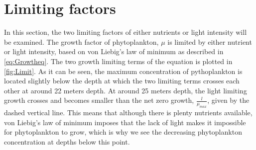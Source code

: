 \newpage
\section{Limiting factors}
In this section, the two limiting factors of either nutrients or light intensity will be examined.
The growth factor of phytoplankton, $\mu$ is limited by either nutrient or light intensity, based on von Liebig's law of minimum as described in \cref{eq:Growtheq}. The two growth limiting terms of the equation is plotted in \cref{fig:Limit}. As it can be seen, the maximum concentration of pythoplankton is located slightly below the depth at which the two limiting terms crosses each other at around 22 meters depth. At around 25 meters depth, the light limiting growth crosses and becomes smaller than the net zero growth, $\frac{l}{\mu_{max}}$, given by the dashed vertical line. This means that although there is plenty nutrients available, von Liebig's law of minimum imposes that the lack of light makes it impossible for phytoplankton to grow, which is why we see the decreasing phytoplankton concentration at depths below this point.  
